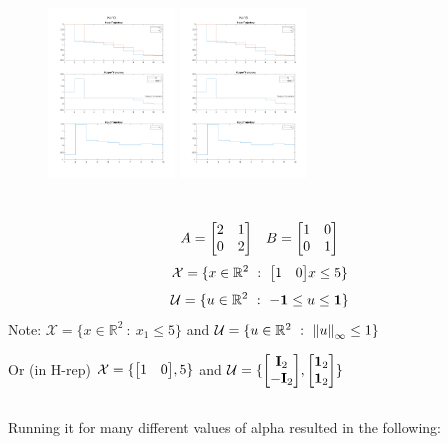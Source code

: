 \documentclass[]{article}
\newcommand{\R}{\mathbb{R}}
\newcommand{\st}{\ : \ }
\begin{document}
\begin{figure}[h]
    \includegraphics[width=0.3\textwidth]{figs/pblm1d_N=10.png}
    \includegraphics[width=0.3\textwidth]{figs/pblm1d_N=15.png}
\end{figure}

\newpage

\newpage
\section{}
\[
    A = \mqty[2&1\\0&2] \quad B = \mqty[1&0\\0&1]
\]\[
    \mathcal{X} = \{x \in \R^2 \st \mqty[1&0] x \leq 5\}
\]\[
    \mathcal{U} = \{u \in \R^2 \st -\vb{1} \leq u \leq \vb{1}\}
\]
Note: $\mathcal{X} = \{x \in \R^2 \st x_1 \leq 5\}$ 
and $\mathcal{U} = \{u \in \R^2 \st \norm{u}_{\infty} \leq 1\}$

Or (in H-rep) $\mathcal{X} = \{\mqty[1&0], 5\}$ 
and $\mathcal{U} = \{\mqty[\vb{I}_2\\-\vb{I}_2], \mqty[\vb{1}_2\\\vb{1}_2]\}$

\subsection{}
Running it for many different values of alpha resulted in the following:
\end{document}
